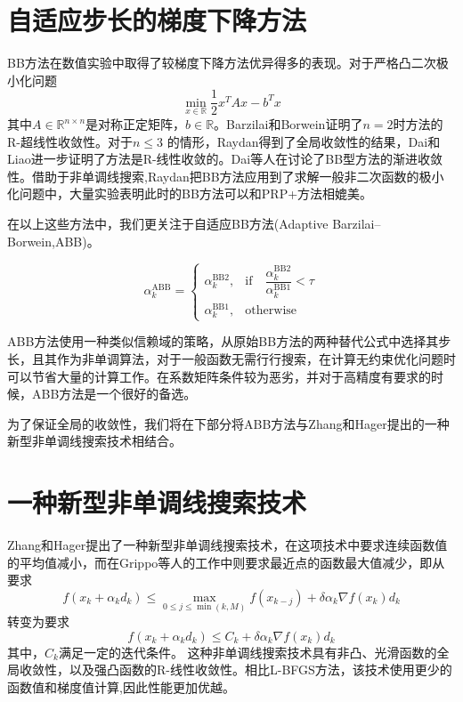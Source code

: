 \section{\hei 自适应步长的梯度下降方法}

BB方法在数值实验中取得了较梯度下降方法优异得多的表现。对于严格凸二次极小化问题
$$  \min_{x \in \mathbb{R}} \frac{1}{2} x^{T}Ax-b^{T}x$$
其中$ A \in \mathbb{R}^{n \times n} $是对称正定矩阵，$b \in \mathbb{R} $。Barzilai和Borwein\cite{barzilai1988two}证明了$ n=2 $时方法的R-超线性收敛性。对于$ n \leq 3 $ 的情形，Raydan\cite{raydan1993barzilai}得到了全局收敛性的结果，Dai和Liao\cite{dai2002r}进一步证明了方法是R-线性收敛的。Dai等人在\cite{dai2013new,dai2005asymptotic}讨论了BB型方法的渐进收敛性。借助于非单调线搜索\cite{grippo1991class},Raydan\cite{raydan1997barzilai}把BB方法应用到了求解一般非二次函数的极小化问题中，大量实验表明此时的BB方法可以和PRP+\cite{gilbert1992global}方法相媲美。

在以上这些方法中，我们更关注于自适应BB方法(Adaptive Barzilai–Borwein,ABB)\cite{zhou2006gradient}。

\begin{equation}\label{ABB}
	\alpha_{k}^{\text{ABB}}=\left\{
	\begin{array}{rcl}
		\alpha_{k}^{\text{BB2}},& \text{if} \quad  \dfrac{\alpha_{k}^{\text{BB2}}}{\alpha_{k}^{\text{BB1}}}<\tau \\
		\alpha_{k}^{\text{BB1}},& \text{otherwise}
	\end{array}\right.
\end{equation}



ABB方法使用一种类似信赖域的策略，从原始BB方法的两种替代公式中选择其步长，且其作为非单调算法，对于一般函数无需行行搜索，在计算无约束优化问题时可以节省大量的计算工作。在系数矩阵条件较为恶劣，并对于高精度有要求的时候，ABB方法是一个很好的备选。

为了保证全局的收敛性，我们将在下部分将ABB方法与Zhang和Hager提出的一种新型非单调线搜索技术\cite{zhang2004nonmonotone}相结合。

\section{\hei 一种新型非单调线搜索技术}

Zhang和Hager提出了一种新型非单调线搜索技术\cite{zhang2004nonmonotone}，在这项技术中要求连续函数值的平均值减小，而在Grippo等人的工作\cite{grippo1986nonmonotone}中则要求最近点的函数最大值减少，即从要求
$$  f(x_{k}+\alpha_{k}d_{k}) \leq \max_{0 \leqslant j \leqslant \min (k, M)}f(x_{k-j})+\delta \alpha_{k} \nabla f(x_{k}) d_{k}$$
转变为要求
$$ f(x_{k}+\alpha_{k}d_{k}) \leq C_{k}+ \delta \alpha_{k} \nabla f(x_{k})d_{k} $$
其中，$ C_{k} $满足一定的迭代条件。
这种非单调线搜索技术具有非凸、光滑函数的全局收敛性，以及强凸函数的R-线性收敛性。相比L-BFGS方法，该技术使用更少的函数值和梯度值计算,因此性能更加优越。

